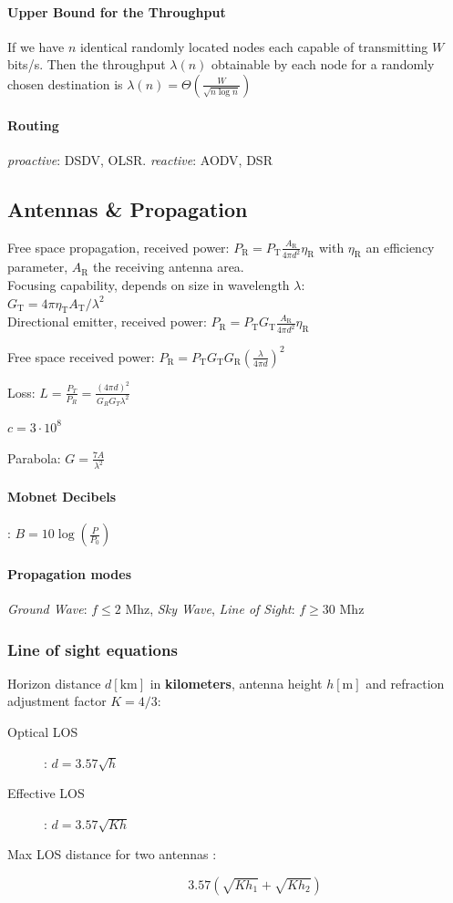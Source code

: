 \documentclass[6pt]{scrartcl}
\begin{document}
\begin{multicols}{4}
\paragraph{Upper Bound for the Throughput} 
If we have $n$ identical randomly located nodes each capable of transmitting $W$ bits/s. 
Then the throughput $\lambda(n)$ obtainable by each node for a randomly chosen destination is $\lambda(n) = \Theta\left(\frac W{\sqrt{n\log n}}\right)$

\paragraph{Routing} \emph{proactive}: DSDV, OLSR. \emph{reactive}: AODV, DSR

\subsection{Antennas \& Propagation}
Free space propagation, received power: $P_\textrm{R} = P_\textrm{T}\frac{A_\textrm{R}}{4\pi d^2}\eta_\textrm{R}$ with $\eta_\textrm{R}$ an efficiency parameter, $A_\textrm{R}$ the receiving antenna area.
\\
Focusing capability, depends on size in wavelength $\lambda$:  
\\$G_\textrm{T} = 4\pi\eta_\textrm{T}A_\textrm{T}/\lambda^2$ \\
Directional emitter, received power: $P_\textrm{R} = P_\textrm{T}G_\textrm{T}\frac{A_\textrm{R}}{4\pi d^2}\eta_\textrm{R}$

Free space received power: $P_\textrm{R} =  P_\textrm{T}G_\textrm{T}G_\textrm{R}(\frac{\lambda}{4\pi d})^2$

Loss: $L = \frac{P_T}{P_R} = \frac{(4\pi d)^2}{G_RG_T\lambda^2} $

$ c = 3 \cdot 10^8 $

Parabola: $G = \frac{7A}{\lambda^2}$

\paragraph{Mobnet Decibels}:
$B = 10\log(\frac{P}{P_0})$

\paragraph{Propagation modes}
\emph{Ground Wave}: $f \le 2$ Mhz, \emph{Sky Wave}, \emph{Line of Sight}: $f \ge 30$ Mhz

\subsubsection{Line of sight equations}
Horizon distance $d[\textrm{km}]$ in \textbf{kilometers}, antenna height $h[\textrm{m}]$ and refraction adjustment factor $K = 4/3$:
\begin{description}
\item[Optical LOS]: $d = 3.57\sqrt{h}$
\item[Effective LOS]: $d = 3.57\sqrt{Kh}$
\item[Max LOS distance for two antennas :] $$3.57(\sqrt{Kh_1}+ \sqrt{Kh_2})$$
\end{description}



\end{multicols}
\end{document}
